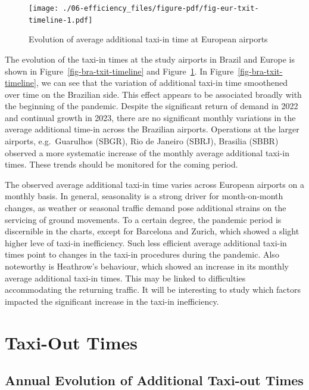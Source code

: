 \documentclass[
  a4paper,
  DIV=11,
  numbers=noendperiod]{scrreport}
\begin{document}
\begin{figure}[H]

{\centering \texttt{[image: ./06-efficiency\_files/figure-pdf/fig-eur-txit-timeline-1.pdf]}

}

\caption{\label{fig-eur-txit-timeline}Evolution of average additional
taxi-in time at European airports}

\end{figure}

The evolution of the taxi-in times at the study airports in Brazil and
Europe is shown in Figure~\ref{fig-bra-txit-timeline} and
Figure~\ref{fig-eur-txit-timeline}. In
Figure~\ref{fig-bra-txit-timeline}, we can see that the variation of
additional taxi-in time smoothened over time on the Brazilian side. This
effect appears to be associated broadly with the beginning of the
pandemic. Despite the significant return of demand in 2022 and continual
growth in 2023, there are no significant monthly variations in the
average additional time-in across the Brazilian airports. Operations at
the larger airports, e.g.~Guarulhos (SBGR), Rio de Janeiro (SBRJ),
Brasilia (SBBR) observed a more systematic increase of the monthly
average additional taxi-in times. These trends should be monitored for
the coming period.

The observed average additional taxi-in time varies across European
airports on a monthly basis. In general, seasonality is a strong driver
for month-on-month changes, as weather or seasonal traffic demand pose
additional strains on the servicing of ground movements. To a certain
degree, the pandemic period is discernible in the charts, except for
Barcelona and Zurich, which showed a slight higher leve of taxi-in
inefficiency. Such less efficient average additional taxi-in times point
to changes in the taxi-in procedures during the pandemic. Also
noteworthy is Heathrow's behaviour, which showed an increase in its
monthly average additional taxi-in times. This may be linked to
difficulties accommodating the returning traffic. It will be interesting
to study which factors impacted the significant increase in the taxi-in
inefficiency.

\hypertarget{taxi-out-times}{%
\section{Taxi-Out Times}\label{taxi-out-times}}

\hypertarget{annual-evolution-of-additional-taxi-out-times}{%
\subsection{Annual Evolution of Additional Taxi-out
Times}\label{annual-evolution-of-additional-taxi-out-times}}
\end{document}
